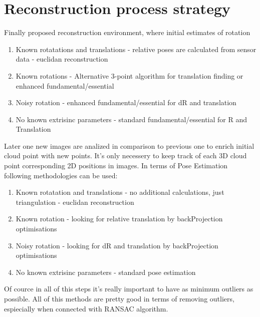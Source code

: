 \section{Reconstruction process strategy}
Finally proposed reconstruction environment, where initial estimates of rotation 
\begin{enumerate} 
\item Known rotatations and translations - relative poses are calculated from sensor data - euclidan reconstruction
\item Known rotations - Alternative 3-point algorithm for translation finding or enhanced fundamental/essential
\item Noisy rotation - enhanced fundamental/essential for dR and translation
\item No known extrisinc parameters - standard fundamental/essential for R and Translation
\end{enumerate}
Later one new images are analized in comparison to previous one to enrich initial cloud point with new points. It's only necessery to keep track of each 3D cloud point corresponding 2D positions in images. In terms of Pose Estimation following methodologies can be used:
\begin{enumerate}
\item Known rotatation and translations - no additional calculations, just triangulation - euclidan reconstruction
\item Known rotation - looking for relative translation by backProjection optimisations
\item Noisy rotation - looking for dR and translation by backProjection optimisations
\item No known extrisinc parameters - standard pose estimation
\end{enumerate}
Of cource in all of this steps it's really important to have as minimum outliers as possible. All of this methods are pretty good in terms of removing outliers, espiecially when connected with RANSAC algorithm.

 
 



